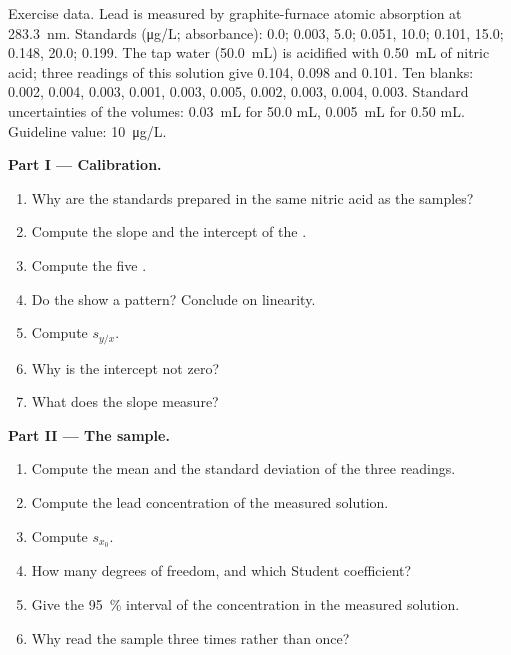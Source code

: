 \begin{problem}
\label{pb:b2:measurement-statistics:1}
Exercise data. Lead is measured by graphite-furnace atomic absorption at \qty{283.3}{nm}. Standards
(\unit{\micro g/L}; absorbance): 0.0; 0.003, 5.0; 0.051, 10.0; 0.101, 15.0; 0.148, 20.0; 0.199. The
tap water (\qty{50.0}{mL}) is acidified with \qty{0.50}{mL} of nitric acid; three readings of this
solution give 0.104, 0.098 and 0.101. Ten blanks: 0.002, 0.004, 0.003, 0.001, 0.003, 0.005, 0.002,
0.003, 0.004, 0.003. Standard uncertainties of the volumes: \qty{0.03}{mL} for 50.0 mL,
\qty{0.005}{mL} for 0.50 mL. Guideline value: \qty{10}{\micro g/L}.

\medskip
\noindent\textbf{Part I --- Calibration.}
\begin{enumerate}
  \item Why are the standards prepared in the same nitric acid as the samples?
  \item Compute the slope and the intercept of the .
  \item Compute the five .
  \item Do the  show a pattern? Conclude on linearity.
  \item Compute $s_{y/x}$.
  \item Why is the intercept not zero?
  \item What does the slope measure?
\end{enumerate}

\medskip
\noindent\textbf{Part II --- The sample.}
\begin{enumerate}[resume]
  \item Compute the mean and the standard deviation of the three readings.
  \item Compute the lead concentration of the measured solution.
  \item Compute $s_{x_0}$.
  \item How many degrees of freedom, and which Student coefficient?
  \item Give the 95~\% interval of the concentration in the measured solution.
  \item Why read the sample three times rather than once?
\end{enumerate}


\end{problem}

